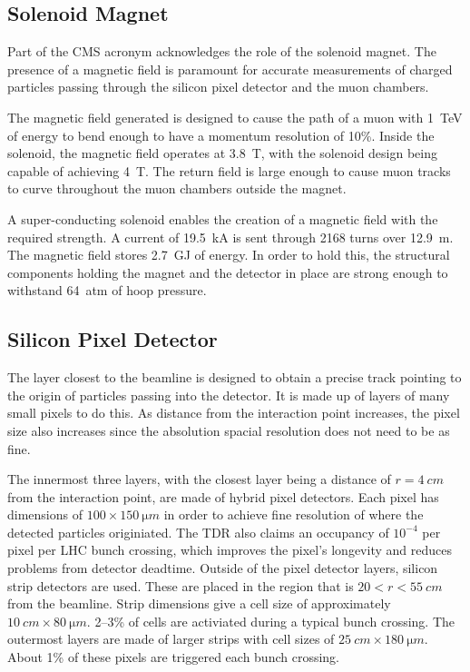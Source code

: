\subsection{Solenoid Magnet}

Part of the CMS acronym acknowledges the role of the solenoid magnet.
The presence of a magnetic field is paramount for accurate measurements
of charged particles passing through the silicon pixel detector and the muon chambers.

The magnetic field generated is designed to cause the path of
a muon with \SI{1}{TeV} of energy to bend enough to have a momentum resolution of 10\%.
Inside the solenoid, the magnetic field operates at \SI{3.8}{T},
with the solenoid design being capable of achieving \SI{4}{T}.
The return field is large enough to cause muon tracks to curve throughout
the muon chambers outside the magnet.

A super-conducting solenoid enables the creation of a magnetic field
with the required strength.
A current of \SI{19.5}{kA} is sent through 2168 turns over \SI{12.9}{m}.
The magnetic field stores \SI{2.7}{GJ} of energy.
In order to hold this, the structural components holding the magnet and
the detector in place are strong enough to withstand \SI{64}{atm} of hoop pressure.

\subsection{Silicon Pixel Detector}

The layer closest to the beamline is designed to obtain a precise track pointing
to the origin of particles passing into the detector.
It is made up of layers of many small pixels to do this.
As distance from the interaction point increases, the pixel size also increases
since the absolution spacial resolution does not need to be as fine.

The innermost three layers, with the closest layer being a distance of
$r=\SI{4}{cm}$ from the interaction point,
are made of hybrid pixel detectors.
Each pixel has dimensions of $100 \times \SI{150}{\micro m}$
in order to achieve fine resolution of where the detected particles originiated.
The TDR also claims an occupancy of $10^{-4}$ per pixel per LHC bunch crossing,
which improves the pixel's longevity and reduces problems from detector deadtime.
Outside of the pixel detector layers,
silicon strip detectors are used.
These are placed in the region that is $20 < r < \SI{55}{cm}$ from the beamline.
Strip dimensions give a cell size of approximately $\SI{10}{cm} \times \SI{80}{\micro m}$.
2--3\% of cells are activiated during a typical bunch crossing.
The outermost layers are made of larger strips with cell sizes of
$\SI{25}{cm} \times \SI{180}{\micro m}$.
About 1\% of these pixels are triggered each bunch crossing.

